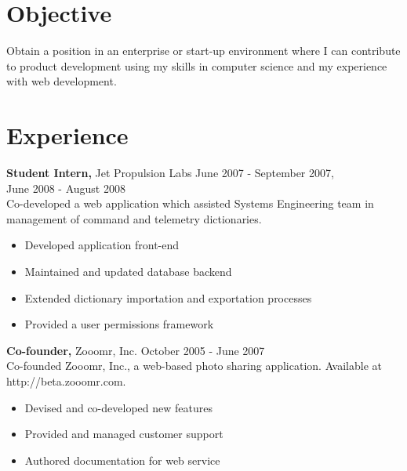 \documentclass[margin]{res}
\begin{document}
 
 
\address{{\bf Current Address} \\ 1355 Harrison St.\\ San Francisco, CA 94103}
\address{{\bf Contact Information} \\ Mobile: (760) 994-9051\\Email: \space michael@mvanveen.net}
\begin{resume} 
 
\section{Objective}
Obtain a position in an enterprise or start-up environment where I can contribute to product development using my skills in computer science and my experience with web development.

\section{Experience}
 {\bf Student Intern,} Jet Propulsion Labs \hfill June 2007 - September 2007, \\
 \makebox[2.9in]{\hfill} June 2008 - August 2008 \\ 
 Co-developed a web application which assisted Systems Engineering team in management of command and telemetry dictionaries.
 \begin{itemize}
 \item Developed application front-end
 \item Maintained and updated database backend
 \item Extended dictionary importation and exportation processes
 \item Provided a user permissions framework
 \end{itemize} 

 {\bf Co-founder,} Zooomr, Inc. \hfill October 2005 - June 2007 \\
 Co-founded Zooomr, Inc., a web-based photo sharing application.  Available at http://beta.zooomr.com.
 \begin{itemize}
 \item Devised and co-developed new features
 \item Provided and managed customer support
 \item Authored documentation for web service
 \end{itemize} 


\end{resume}
\end{document}
